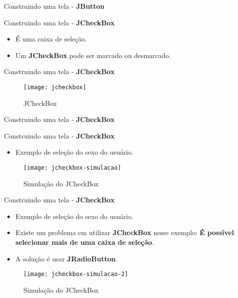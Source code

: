 \documentclass[10pt]{beamer}
\begin{document}
\begin{frame}{Construindo uma tela - \textbf{JButton}}

\end{frame}{}



\begin{frame}{Construindo uma tela - \textbf{JCheckBox}}
\begin{itemize}
\item É uma caixa de seleção.
\item Um \textbf{JCheckBox} pode ser marcado ou desmarcado.
\end{itemize}
\end{frame}{}

\begin{frame}{Construindo uma tela - \textbf{JCheckBox}}
\begin{figure}[!htb]
    \centering
    \texttt{[image: jcheckbox]}
    \caption{JCheckBox}
    \label{figRotulo}
  \end{figure}
\end{frame}{}

\begin{frame}{Construindo uma tela - \textbf{JCheckBox}}

\end{frame}{}


\begin{frame}{Construindo uma tela - \textbf{JCheckBox}}
\begin{itemize}
\item Exemplo de seleção do sexo do usuário.
\end{itemize}
\begin{figure}[!htb]
    \centering
    \texttt{[image: jcheckbox-simulacao]}
    \caption{Simulação do JCheckBox}
    \label{figRotulo}
  \end{figure}
\end{frame}{}


\begin{frame}{Construindo uma tela - \textbf{JCheckBox}}
\begin{itemize}
\item Exemplo de seleção do sexo do usuário.
\item Existe um problema em utilizar \textbf{JCheckBox} nesse exemplo: \textbf{É possível selecionar mais de uma caixa de seleção}.
\item A solução é usar \textbf{JRadioButton}.
\end{itemize}
\begin{figure}[!htb]
    \centering
    \texttt{[image: jcheckbox-simulacao-2]}
    \caption{Simulação do JCheckBox}
    \label{figRotulo}
  \end{figure}
\end{frame}{}
\end{document}
